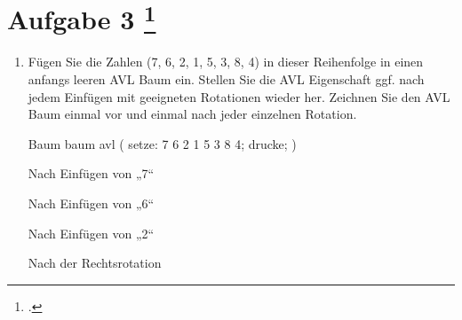 \documentclass{bschlangaul-aufgabe}
\begin{document}
\section{Aufgabe 3
\footcite{examen:66115:2014:03}}

\begin{enumerate}


\item Fügen Sie die Zahlen (7, 6, 2, 1, 5, 3, 8, 4) in dieser
Reihenfolge in einen anfangs leeren AVL Baum ein. Stellen Sie die AVL
Eigenschaft ggf. nach jedem Einfügen mit geeigneten Rotationen wieder
her. Zeichnen Sie den AVL Baum einmal vor und einmal nach jeder
einzelnen Rotation.

\begin{liProjektSprache}{Baum}
baum avl (
  setze: 7 6 2 1 5 3 8 4;
  drucke;
)
\end{liProjektSprache}

\begin{liDiagramm}{Nach Einfügen von „7“}
\end{liDiagramm}

\begin{liDiagramm}{Nach Einfügen von „6“}
\end{liDiagramm}

\begin{liDiagramm}{Nach Einfügen von „2“}
\end{liDiagramm}

\begin{liDiagramm}{Nach der Rechtsrotation}
\end{liDiagramm}


\end{enumerate}
\end{document}

